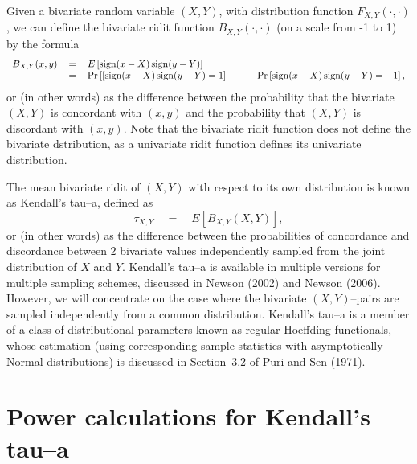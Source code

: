 \documentclass[a4paper]{article}      %
\begin{document}
Given a bivariate random variable $(X,Y)$, with distribution function $F_{X,Y}(\cdot,\cdot)$,
we can define the bivariate ridit function $B_{X,Y}(\cdot,\cdot)$ (on a scale from -1 to 1)
by the formula
\begin{equation}
\begin{array}{rcl}
B_{X,Y}(x,y) &\, = \,& E\left[ {\rm sign}(x-X) \, {\rm sign}(y-Y) \right] \\
&\, = \,& {\rm Pr}\left[[{\rm sign}(x-X)\,{\rm sign}(y-Y)=1\right] \quad - \quad {\rm Pr}\left[{\rm sign}(x-X)\,{\rm sign}(y-Y)=-1\right],
\end{array}
\label{eq:eqseq2}
\end{equation}
or  (in other words) as the difference between the probability that the bivariate $(X,Y)$ is concordant with $(x,y)$
and the probability that $(X,Y)$ is discordant with $(x,y)$.
Note that the bivariate ridit function does not define the bivariate dstribution,
as a univariate ridit function defines its univariate distribution.

The mean bivariate ridit of $(X,Y)$ with respect to its own distribution
is known as Kendall's tau--a, defined as
\begin{equation}
\tau_{X,Y} \quad = \quad E\left[B_{X,Y}(X,Y)\right],
\label{eq:eqseq3}
\end{equation}
or (in other words) as the difference between the probabilities of concordance and discordance
between 2 bivariate values independently sampled from the joint distribution of $X$ and $Y$.
Kendall's tau--a is available in multiple versions for multiple sampling schemes, discussed in
Newson (2002)\cite{newson2002} and Newson (2006)\cite{newson2006}.
However, we will concentrate on the case where the bivariate $(X,Y)$--pairs
are sampled independently from a common distribution.
Kendall's tau--a is a member of a class of distributional parameters known as regular Hoeffding functionals,
whose estimation
(using corresponding sample statistics with asymptotically Normal distributions) is discussed
in Section~3.2 of Puri and Sen (1971)\cite{purisen1971}.

\section{Power calculations for Kendall's tau--a}
\end{document}
